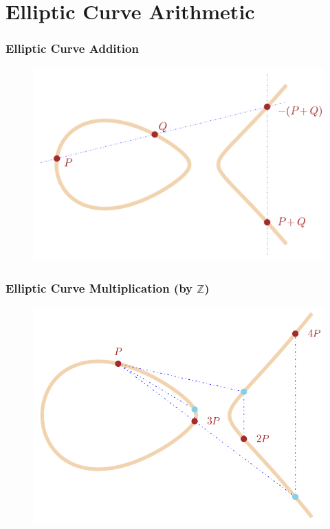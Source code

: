 \documentclass{beamer}
\begin{document}
\section{Elliptic Curve Arithmetic}
\begin{frame}
\frametitle{Elliptic Curve Addition}
\begin{figure}[H]
\centering
\includegraphics[width=\textwidth]{ch2-point-addition}
\end{figure}
\end{frame}

\begin{frame}
\frametitle{Elliptic Curve Multiplication (by $\mathbb Z$)}
\begin{figure}[H]
\centering
\includegraphics[width=\textwidth]{ch2-point-multiplication}
\end{figure}
\end{frame}
\end{document}
